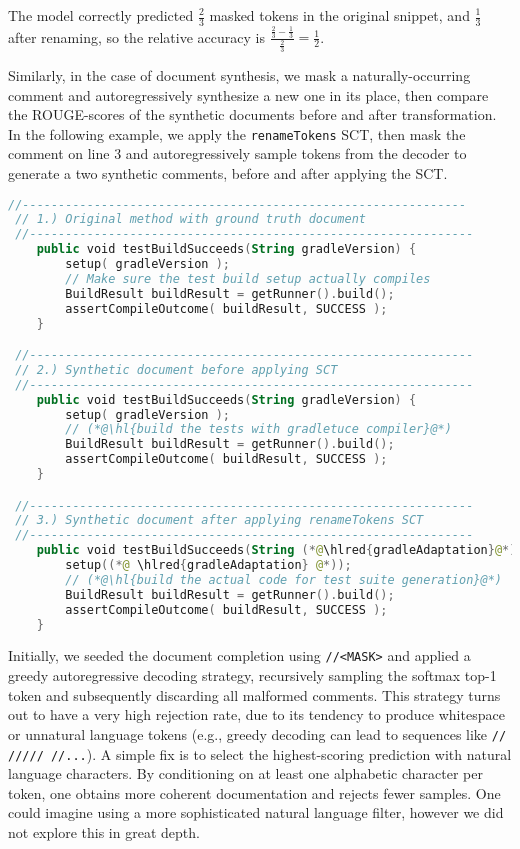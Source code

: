 \documentclass[sigconf,review,anonymous]{acmart}
\DeclareRobustCommand{\hlred}[1]{{\sethlcolor{pink}\hl{#1}}}
\begin{document}
  The model correctly predicted $\frac{2}{3}$ masked tokens in the original snippet, and $\frac{1}{3}$ after renaming, so the relative accuracy is $\frac{\frac{2}{3} - \frac{1}{3}}{\frac{2}{3}} = \frac{1}{2}$.

  Similarly, in the case of document synthesis, we mask a naturally-occurring comment and autoregressively synthesize a new one in its place, then compare the ROUGE-scores of the synthetic documents before and after transformation. In the following example, we apply the \lstinline|renameTokens| SCT, then mask the comment on line 3 and autoregressively sample tokens from the decoder to generate a two synthetic comments, before and after applying the SCT.

  \begin{lstlisting}[basicstyle=\scriptsize\ttfamily, language=kotlin,label={lst:example3}]
 //--------------------------------------------------------------
 // 1.) Original method with ground truth document
 //--------------------------------------------------------------
    public void testBuildSucceeds(String gradleVersion) {
        setup( gradleVersion );
        // Make sure the test build setup actually compiles
        BuildResult buildResult = getRunner().build();
        assertCompileOutcome( buildResult, SUCCESS );
    }

 //--------------------------------------------------------------
 // 2.) Synthetic document before applying SCT
 //--------------------------------------------------------------
    public void testBuildSucceeds(String gradleVersion) {
        setup( gradleVersion );
        // (*@\hl{build the tests with gradletuce compiler}@*)
        BuildResult buildResult = getRunner().build();
        assertCompileOutcome( buildResult, SUCCESS );
    }

 //--------------------------------------------------------------
 // 3.) Synthetic document after applying renameTokens SCT
 //--------------------------------------------------------------
    public void testBuildSucceeds(String (*@\hlred{gradleAdaptation}@*)) {
        setup((*@ \hlred{gradleAdaptation} @*));
        // (*@\hl{build the actual code for test suite generation}@*)
        BuildResult buildResult = getRunner().build();
        assertCompileOutcome( buildResult, SUCCESS );
    }
  \end{lstlisting}

  Initially, we seeded the document completion using \texttt{//<MASK>} and applied a greedy autoregressive decoding strategy, recursively sampling the softmax top-1 token and subsequently discarding all malformed comments. This strategy turns out to have a very high rejection rate, due to its tendency to produce whitespace or unnatural language tokens (e.g., greedy decoding can lead to sequences like \texttt{// ///// //...}). A simple fix is to select the highest-scoring prediction with natural language characters. By conditioning on at least one alphabetic character per token, one obtains more coherent documentation and rejects fewer samples. One could imagine using a more sophisticated natural language filter, however we did not explore this in great depth.
\end{document}
